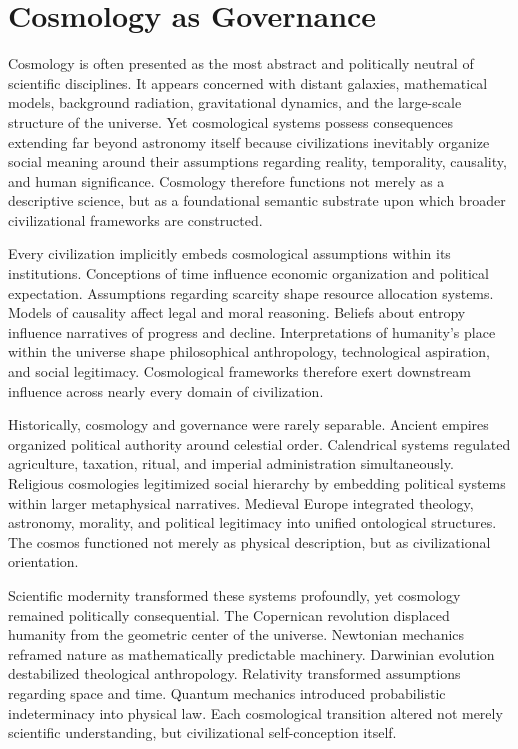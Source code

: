 \documentclass[11pt,a4paper]{article}
\begin{document}
\section{Cosmology as Governance}

Cosmology is often presented as the most abstract and politically neutral of scientific disciplines. It appears concerned with distant galaxies, mathematical models, background radiation, gravitational dynamics, and the large-scale structure of the universe. Yet cosmological systems possess consequences extending far beyond astronomy itself because civilizations inevitably organize social meaning around their assumptions regarding reality, temporality, causality, and human significance. Cosmology therefore functions not merely as a descriptive science, but as a foundational semantic substrate upon which broader civilizational frameworks are constructed.

Every civilization implicitly embeds cosmological assumptions within its institutions. Conceptions of time influence economic organization and political expectation. Assumptions regarding scarcity shape resource allocation systems. Models of causality affect legal and moral reasoning. Beliefs about entropy influence narratives of progress and decline. Interpretations of humanity's place within the universe shape philosophical anthropology, technological aspiration, and social legitimacy. Cosmological frameworks therefore exert downstream influence across nearly every domain of civilization.

Historically, cosmology and governance were rarely separable. Ancient empires organized political authority around celestial order. Calendrical systems regulated agriculture, taxation, ritual, and imperial administration simultaneously. Religious cosmologies legitimized social hierarchy by embedding political systems within larger metaphysical narratives. Medieval Europe integrated theology, astronomy, morality, and political legitimacy into unified ontological structures. The cosmos functioned not merely as physical description, but as civilizational orientation.

Scientific modernity transformed these systems profoundly, yet cosmology remained politically consequential. The Copernican revolution displaced humanity from the geometric center of the universe. Newtonian mechanics reframed nature as mathematically predictable machinery. Darwinian evolution destabilized theological anthropology. Relativity transformed assumptions regarding space and time. Quantum mechanics introduced probabilistic indeterminacy into physical law. Each cosmological transition altered not merely scientific understanding, but civilizational self-conception itself.
\end{document}
